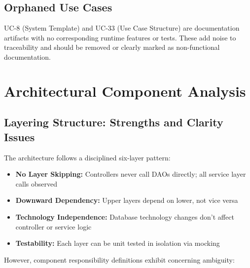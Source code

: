 \documentclass[11pt,a4paper]{article}
\begin{document}
\subsection{Orphaned Use Cases}

UC-8 (System Template) and UC-33 (Use Case Structure) are documentation artifacts with no corresponding runtime features or tests. These add noise to traceability and should be removed or clearly marked as non-functional documentation.

\section{Architectural Component Analysis}

\subsection{Layering Structure: Strengths and Clarity Issues}

The architecture follows a disciplined six-layer pattern:

\begin{tcolorbox}[colback=strengthgreen!5,colframe=strengthgreen,title=\textbf{Layering Strengths}]
\begin{itemize}[leftmargin=*]
    \item \textbf{No Layer Skipping:} Controllers never call DAOs directly; all service layer calls observed
    \item \textbf{Downward Dependency:} Upper layers depend on lower, not vice versa
    \item \textbf{Technology Independence:} Database technology changes don't affect controller or service logic
    \item \textbf{Testability:} Each layer can be unit tested in isolation via mocking
\end{itemize}
\end{tcolorbox}

However, component responsibility definitions exhibit concerning ambiguity:
\end{document}
